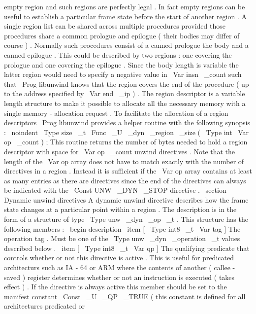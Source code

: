 {
empty
region
}
and
such
regions
are
perfectly
legal
.
In
fact
empty
regions
can
be
useful
to
establish
a
particular
frame
state
before
the
start
of
another
region
.
A
single
region
list
can
be
shared
across
multiple
procedures
provided
those
procedures
share
a
common
prologue
and
epilogue
(
their
bodies
may
differ
of
course
)
.
Normally
such
procedures
consist
of
a
canned
prologue
the
body
and
a
canned
epilogue
.
This
could
be
described
by
two
regions
:
one
covering
the
prologue
and
one
covering
the
epilogue
.
Since
the
body
length
is
variable
the
latter
region
would
need
to
specify
a
negative
value
in
\
Var
{
insn
\
_count
}
such
that
\
Prog
{
libunwind
}
knows
that
the
region
covers
the
end
of
the
procedure
(
up
to
the
address
specified
by
\
Var
{
end
\
_ip
}
)
.
The
region
descriptor
is
a
variable
length
structure
to
make
it
possible
to
allocate
all
the
necessary
memory
with
a
single
memory
-
allocation
request
.
To
facilitate
the
allocation
of
a
region
descriptors
\
Prog
{
libunwind
}
provides
a
helper
routine
with
the
following
synopsis
:
\
noindent
\
Type
{
size
\
_t
}
\
Func
{
\
_U
\
_dyn
\
_region
\
_size
}
(
\
Type
{
int
}
\
Var
{
op
\
_count
}
)
;
This
routine
returns
the
number
of
bytes
needed
to
hold
a
region
descriptor
with
space
for
\
Var
{
op
\
_count
}
unwind
directives
.
Note
that
the
length
of
the
\
Var
{
op
}
array
does
not
have
to
match
exactly
with
the
number
of
directives
in
a
region
.
Instead
it
is
sufficient
if
the
\
Var
{
op
}
array
contains
at
least
as
many
entries
as
there
are
directives
since
the
end
of
the
directives
can
always
be
indicated
with
the
\
Const
{
UNW
\
_DYN
\
_STOP
}
directive
.
\
section
{
Dynamic
unwind
directives
}
A
dynamic
unwind
directive
describes
how
the
frame
state
changes
at
a
particular
point
within
a
region
.
The
description
is
in
the
form
of
a
structure
of
type
\
Type
{
unw
\
_dyn
\
_op
\
_t
}
.
This
structure
has
the
following
members
:
\
begin
{
description
}
\
item
[
\
Type
{
int8
\
_t
}
\
Var
{
tag
}
]
The
operation
tag
.
Must
be
one
of
the
\
Type
{
unw
\
_dyn
\
_operation
\
_t
}
values
described
below
.
\
item
[
\
Type
{
int8
\
_t
}
\
Var
{
qp
}
]
The
qualifying
predicate
that
controls
whether
or
not
this
directive
is
active
.
This
is
useful
for
predicated
architecturs
such
as
IA
-
64
or
ARM
where
the
contents
of
another
(
callee
-
saved
)
register
determines
whether
or
not
an
instruction
is
executed
(
takes
effect
)
.
If
the
directive
is
always
active
this
member
should
be
set
to
the
manifest
constant
\
Const
{
\
_U
\
_QP
\
_TRUE
}
(
this
constant
is
defined
for
all
architectures
predicated
or
